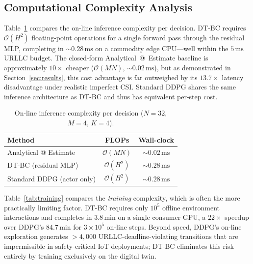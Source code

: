 \documentclass[journal]{IEEEtran}
\begin{document}
\subsection{Computational Complexity Analysis}
\label{sec:complexity}

Table~\ref{tab:complexity} compares the on-line inference complexity
per decision. DT-BC requires $\mathcal{O}(H^2)$ floating-point
operations for a single forward pass through the residual MLP, completing
in $\sim\!0.28\,\text{ms}$ on a commodity edge CPU---well within the
$5\,\text{ms}$ URLLC budget. The closed-form Analytical~@~Estimate
baseline is approximately $10\!\times$ cheaper ($\mathcal{O}(MN)$,
$\sim\!0.02\,\text{ms}$), but as demonstrated in
Section~\ref{sec:results}, this cost advantage is far outweighed by
its $13.7\!\times$ latency disadvantage under realistic imperfect CSI.
Standard DDPG shares the same inference architecture as DT-BC and
thus has equivalent per-step cost.

\begin{table}[t]
\centering
\caption{On-line inference complexity per decision
         ($N\!=\!32$, $M\!=\!4$, $K\!=\!4$).}
\label{tab:complexity}
\begin{tabular}{lcc}
\toprule
\textbf{Method}               & \textbf{FLOPs}            & \textbf{Wall-clock} \\
\midrule
Analytical @ Estimate         & $\mathcal{O}(MN)$         & $\sim\!0.02\,\text{ms}$ \\
DT-BC (residual MLP)          & $\mathcal{O}(H^2)$        & $\sim\!0.28\,\text{ms}$ \\
Standard DDPG (actor only)    & $\mathcal{O}(H^2)$        & $\sim\!0.28\,\text{ms}$ \\
\bottomrule
\end{tabular}
\end{table}

Table~\ref{tab:training} compares the \emph{training} complexity,
which is often the more practically limiting factor. DT-BC requires
only $10^5$ offline environment interactions and completes in
$3.8\,\text{min}$ on a single consumer GPU, a $22\!\times$ speedup
over DDPG's $84.7\,\text{min}$ for $3\!\times\!10^5$ on-line steps.
Beyond speed, DDPG's on-line exploration generates
$>\!4{,}000$ URLLC-deadline-violating transitions that are
impermissible in safety-critical IoT deployments; DT-BC eliminates
this risk entirely by training exclusively on the digital twin.
\end{document}
